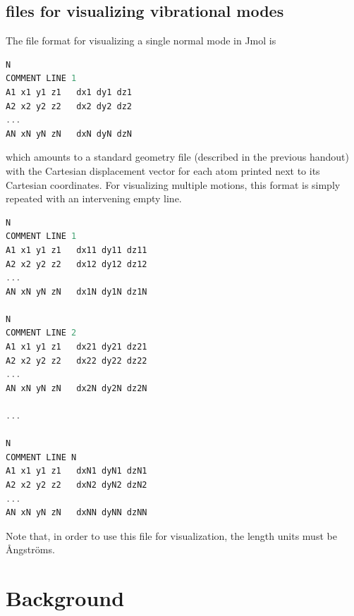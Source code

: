 \documentclass[11pt]{article}
\begin{document}
\subsection{ files for visualizing vibrational modes}
The file format for visualizing a single normal mode in Jmol is
\begin{addmargin}{5cm}{}
\begin{lstlisting}[language=c++]
N
COMMENT LINE 1
A1 x1 y1 z1   dx1 dy1 dz1
A2 x2 y2 z2   dx2 dy2 dz2
...                        
AN xN yN zN   dxN dyN dzN
\end{lstlisting}
\end{addmargin}
which amounts to a standard  geometry file (described in the previous handout) with the Cartesian displacement vector for each atom printed next to its Cartesian coordinates.
For visualizing multiple motions, this format is simply repeated with an intervening empty line.
\begin{addmargin}{5cm}{}
\begin{lstlisting}[language=c++]
N
COMMENT LINE 1
A1 x1 y1 z1   dx11 dy11 dz11
A2 x2 y2 z2   dx12 dy12 dz12
...                        
AN xN yN zN   dx1N dy1N dz1N
                           
N                          
COMMENT LINE 2             
A1 x1 y1 z1   dx21 dy21 dz21
A2 x2 y2 z2   dx22 dy22 dz22
...                        
AN xN yN zN   dx2N dy2N dz2N
                           
...                        
                           
N                          
COMMENT LINE N             
A1 x1 y1 z1   dxN1 dyN1 dzN1
A2 x2 y2 z2   dxN2 dyN2 dzN2
...                        
AN xN yN zN   dxNN dyNN dzNN
\end{lstlisting}
\end{addmargin}
Note that, in order to use this file for visualization, the length units must be \AA ngstr\"oms.

\newpage
\section{Background}\label{background}
\end{document}

